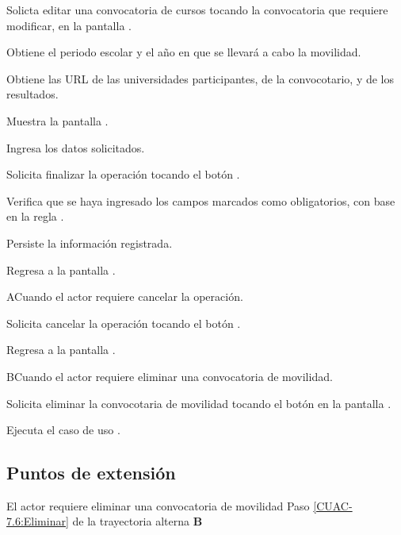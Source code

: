 	\begin{UCtrayectoria}
		
		\UCpaso [\UCactor] Solicta editar una convocatoria de cursos tocando la convocatoria que requiere modificar, en la pantalla .
		
		\UCpaso Obtiene el periodo escolar y el año en que se llevará a cabo la movilidad.
		
		\UCpaso Obtiene las URL de las universidades participantes, de la convocotario, y de los resultados.
		
		\UCpaso Muestra la pantalla .
		
		\UCpaso [\UCactor] Ingresa los datos solicitados.
		
		\UCpaso [\UCactor] Solicita finalizar la operación tocando el botón .  
		
		\UCpaso Verifica que se haya ingresado los campos marcados como obligatorios, con base en la regla .
		
		\UCpaso Persiste la información registrada.
		
		\UCpaso Regresa a la pantalla .
		
	\end{UCtrayectoria}

	\begin{UCtrayectoriaA}{A}{Cuando el actor requiere cancelar la operación.}
		
		\UCpaso [\UCactor] Solicita cancelar la operación tocando el botón .
		
		\UCpaso Regresa a la pantalla .
		
	\end{UCtrayectoriaA}

	\begin{UCtrayectoriaA}{B}{Cuando el actor requiere eliminar una convocatoria de movilidad.}
		
		\UCpaso [\UCactor] Solicita eliminar la convocotaria de movilidad tocando el botón  en la pantalla .
		
		\UCpaso \label{CUAC-7.6:Eliminar} Ejecuta el caso de uso .
		
	\end{UCtrayectoriaA}

	\subsection{Puntos de extensión}
	
	\UCExtensionPoint
	{El actor requiere eliminar una convocatoria de movilidad}
	{ Paso \ref{CUAC-7.6:Eliminar} de la trayectoria alterna \textbf{B}}
	{}
